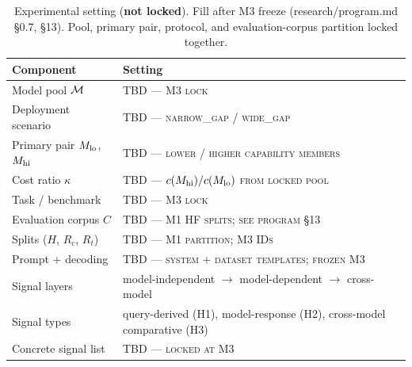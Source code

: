 \begin{table}[t]
  \centering
  \small
  \begin{tabular}{@{}ll@{}}
    \toprule
    \textbf{Component} & \textbf{Setting} \\
    \midrule
    Model pool $\mathcal{M}$ & \textsc{TBD --- M3 lock} \\
    Deployment scenario & \textsc{TBD --- narrow\_gap / wide\_gap} \\
    Primary pair $M_{\mathrm{lo}}$, $M_{\mathrm{hi}}$ & \textsc{TBD --- lower / higher capability members} \\
    Cost ratio $\kappa$ & \textsc{TBD --- $c(M_{\mathrm{hi}})/c(M_{\mathrm{lo}})$ from locked pool} \\
    Task / benchmark & \textsc{TBD --- M3 lock} \\
    Evaluation corpus $C$ & \textsc{TBD --- M1 HF splits; see program \S13} \\
    Splits ($H$, $R_c$, $R_t$) & \textsc{TBD --- M1 partition; M3 IDs} \\
    Prompt + decoding & \textsc{TBD --- system + dataset templates; frozen M3} \\
    Signal layers & model-independent $\to$ model-dependent $\to$ cross-model \\
    Signal types & query-derived (H1), model-response (H2), cross-model comparative (H3) \\
    Concrete signal list & \textsc{TBD --- locked at M3} \\
    \bottomrule
  \end{tabular}
  \caption{Experimental setting (\textbf{not locked}). Fill after M3 freeze (research/program.md \S0.7, \S13). Pool, primary pair, protocol, and evaluation-corpus partition locked together.}
  \label{tab:setup}
\end{table}
